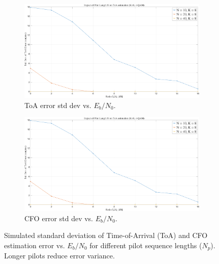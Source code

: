 \documentclass[11pt]{article}
\begin{document}
	\begin{figure}[H]
		\centering
		\begin{subfigure}[b]{0.48\textwidth}
			\centering
			\includegraphics[width=\linewidth]{Images/frame_sync_pilot_len.png} 
			\caption{ToA error std dev vs. $E_b/N_0$.}
			\label{fig:frame_sync_pilot_len_style_change}
		\end{subfigure}
		\hfill
		\begin{subfigure}[b]{0.48\textwidth}
			\centering
			\includegraphics[width=\linewidth]{Images/cfo_est_pilot_len.png} 
			\caption{CFO error std dev vs. $E_b/N_0$.}
			\label{fig:cfo_est_pilot_len_style_change}
		\end{subfigure}
		\caption{Simulated standard deviation of Time-of-Arrival (ToA) and CFO estimation error vs. $E_b/N_0$ for different pilot sequence lengths ($N_p$). Longer pilots reduce error variance.}
		\label{fig:acquisition_vs_pilot_len}
	\end{figure}
	
\end{document}
